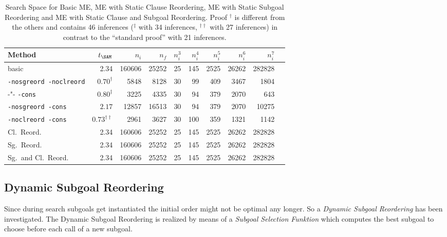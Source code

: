 \begin{table}[htb]
\begin{center}
\begin{tabular}{|l|r|r|r||r||r|r|r|r|r|}
\hline
Method & $t_{\SAM}$ & $n_i$ & $n_f$ & 
	$n_i^3$ & $n_i^4$ & $n_i^5$ & $n_i^6$ & $n_i^7$ \\
\hline\hline
basic & 2.34 & 160606 & 25252 &
	25 & 145 & 2525 & 26262 & 282828 \\
\hline
{\tt -nosgreord -noclreord} & $0.70^\dagger$ & 5848 & 8128 &
	30 & 99 & 409 & 3467 & 1804 \\
\hline
-"- {\tt -cons} & $0.80^\ddagger$ & 3225 & 4335 &
	30 & 94 & 379 & 2070 & 643 \\
\hline
{\tt -nosgreord -cons} & $2.17$ & 12857 & 16513 &
	30 & 94 & 379 & 2070 & 10275 \\
\hline
{\tt -noclreord -cons} & $0.73^{\dagger\dagger}$ & 2961 & 3627 &
	30 & 100 & 359 & 1321 & 1142 \\
\hline
Cl.\ Reord.\ & 2.34 & 160606 & 25252 &
	25 & 145 & 2525 & 26262 & 282828 \\
\hline
Sg.\ Reord.\ & 2.34 & 160606 & 25252 &
	25 & 145 & 2525 & 26262 & 282828 \\
\hline
Sg.\ and Cl.\ Reord.\ & 2.34 & 160606 & 25252 &
	25 & 145 & 2525 & 26262 & 282828 \\
\hline\hline
\end{tabular}
\end{center}
\caption{Search Space for Basic ME, ME with Static Clause Reordering,
         ME with Static Subgoal Reordering and ME with Static Clause
         and Subgoal Reordering.
	Proof $^\dagger$ is different from the others and 
	contains 46 inferences ($^\ddagger$ with 34 inferences,
	$^{\dagger\dagger}$ with 27 inferences)
	in contrast to the ``standard proof'' with 21 inferences.} 
\label{tab:tut2:results.static-reord}
\end{table}


\subsection{Dynamic Subgoal Reordering}

Since during search subgoals get instantiated the initial order
might not be optimal any longer. So a {\em Dynamic Subgoal
Reordering\/} has been investigated. The Dynamic Subgoal
Reordering is realized by means of a {\em Subgoal Selection
Funktion\/} which computes the best subgoal to choose before each call
of a new subgoal.

